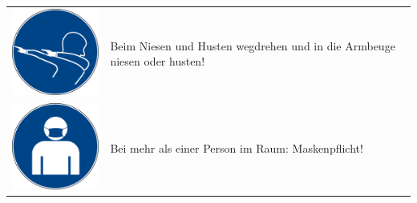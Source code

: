 \documentclass[24pt, a4paper, portrait]{article}
\begin{document}
\begin{tabular}{ m{4.2cm} m{11.5cm} }
    \vspace{2mm}
    \includegraphics[width=4cm]{niesetikette} & Beim Niesen und Husten wegdrehen und in die Armbeuge niesen oder husten! \\
    \vspace{2mm}
    \includegraphics[width=4cm]{maskenpflicht} & Bei mehr als einer Person im Raum: Maskenpflicht! \\
\end{tabular}
\end{document}
